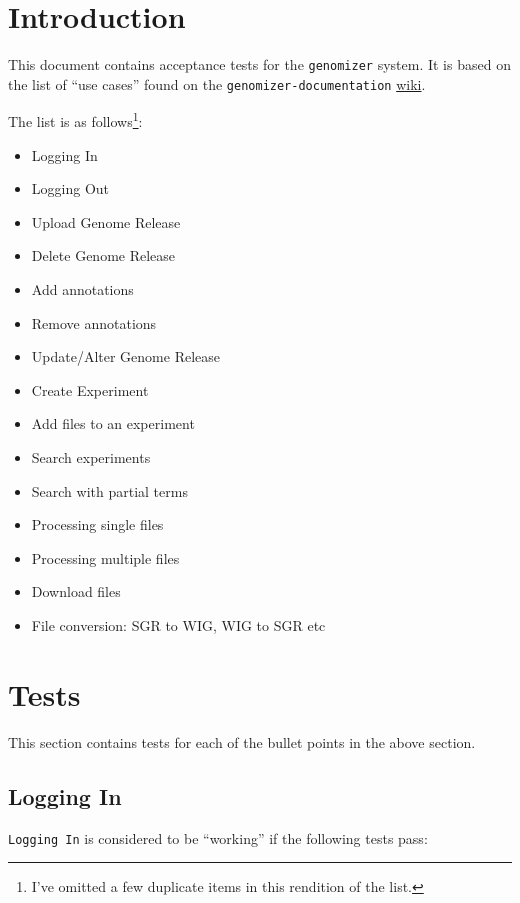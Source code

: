 \section{Introduction}\label{introduction}

This document contains acceptance tests for the \texttt{genomizer}
system. It is based on the list of ``use cases'' found on the
\texttt{genomizer-documentation}
\href{https://github.com/genomizer/genomizer-documentation/wiki/Use-cases}{wiki}.

The list is as follows\footnote{I've omitted a few duplicate items in
  this rendition of the list.}:

\begin{itemize}
\itemsep1pt\parskip0pt
\item
  Logging In
\item
  Logging Out
\item
  Upload Genome Release
\item
  Delete Genome Release
\item
  Add annotations
\item
  Remove annotations
\item
  Update/Alter Genome Release
\item
  Create Experiment
\item
  Add files to an experiment
\item
  Search experiments
\item
  Search with partial terms
\item
  Processing single files
\item
  Processing multiple files
\item
  Download files
\item
  File conversion: SGR to WIG, WIG to SGR etc
\end{itemize}

\section{Tests}\label{tests}

This section contains tests for each of the bullet points in the above
section.

\subsection{Logging In}\label{logging-in}

\texttt{Logging\ In} is considered to be ``working'' if the following
tests pass:

